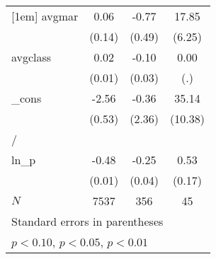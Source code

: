 \documentclass{article}
\begin{document}
{\begin{tabular}{l*{3}{c}}
[1em]
avgmar      &        0.06         &       -0.77         &       17.85\sym{***}\\
            &      (0.14)         &      (0.49)         &      (6.25)         \\
[1em]
avgclass    &        0.02\sym{*}  &       -0.10\sym{***}&        0.00         \\
            &      (0.01)         &      (0.03)         &         (.)         \\
[1em]
\_cons      &       -2.56\sym{***}&       -0.36         &       35.14\sym{***}\\
            &      (0.53)         &      (2.36)         &     (10.38)         \\
\hline
/           &                     &                     &                     \\
ln\_p        &       -0.48\sym{***}&       -0.25\sym{***}&        0.53\sym{***}\\
            &      (0.01)         &      (0.04)         &      (0.17)         \\
\hline
\(N\)       &        7537         &         356         &          45         \\
\hline\hline
\multicolumn{4}{l}{\footnotesize Standard errors in parentheses}\\
\multicolumn{4}{l}{\footnotesize \sym{*} \(p<0.10\), \sym{**} \(p<0.05\), \sym{***} \(p<0.01\)}\\
\end{tabular}
}
\end{document}
